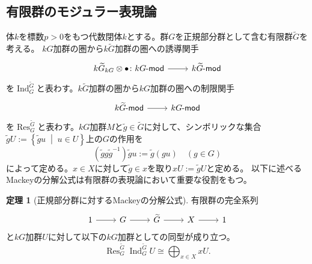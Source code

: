 \documentclass[a4paper,uplatex,dvipdfmx]{jsarticle}
\theoremstyle{definition}
\newtheorem{theorem}{定理}[section]
\newcommand{\setmid}{\; \middle|\;}
\newcommand{\lmod}{\operatorname{\mathsf{\hspace{-2pt}-mod}}}
\newcommand{\induc}{{\operatorname{Ind}\nolimits}}
\newcommand{\restr}{{\operatorname{Res}\nolimits}}
\begin{document}
\subsection{有限群のモジュラー表現論}
体\(k\)を標数\(p>0\)をもつ代数閉体\(k\)とする。群\(G\)を正規部分群として含む有限群\(\widetilde{G}\)を考える。
\(kG\)加群の圏から\(k\widetilde{G}\)加群の圏への誘導関手
\begin{equation}
  \begin{tikzcd}
    k\widetilde{G}_{kG}\otimes \bullet \colon kG\lmod \ar[r] &k\widetilde{G}\lmod
  \end{tikzcd}
\end{equation}
を\(\induc_G^{\widetilde{G}}\)と表わす。\(k\widetilde{G}\)加群の圏から\(kG\)加群の圏への制限関手
\begin{equation}
  \begin{tikzcd}
    k\widetilde{G}\lmod \ar[r] &kG\lmod
  \end{tikzcd}
\end{equation}
を\(\restr_G^{\widetilde{G}}\)と表わす。\(kG\)加群\(M\)と\(\widetilde{g}\in \widetilde{G}\)に対して、シンボリックな集合\(\widetilde{g}U:=\left\{ \widetilde{g}u \setmid u \in U\right\}\)上の\(G\)の作用を
\begin{equation}
  (\widetilde{g}g\widetilde{g}^{-1})\widetilde{g}u:=\widetilde{g}(gu)\quad(g\in G)
\end{equation}
によって定める。\(x\in X\)に対して\(\widetilde{g}\in x\)を取り\(xU:=\widetilde{g}U\)と定める。
以下に述べるMackeyの分解公式は有限群の表現論において重要な役割をもつ。
\begin{theorem}[正規部分群に対するMackeyの分解公式]
  有限群の完全系列
  \begin{equation}
    \begin{tikzcd}
      1\ar[r]&G\ar[r]&\widetilde{G}\ar[r]&X\ar[r]&1
    \end{tikzcd}
  \end{equation}
  と\(kG\)加群\(U\)に対して以下の\(kG\)加群としての同型が成り立つ。
  \begin{equation}
    \restr_G^{\widetilde{G}}\induc_G^{\widetilde{G}}U\cong \bigoplus_{x\in X}xU.
  \end{equation}
\end{theorem}
\end{document}
